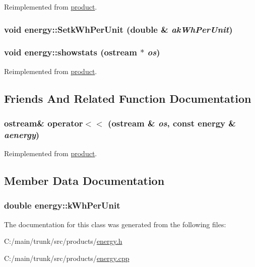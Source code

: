 Reimplemented from \hyperlink{classproduct_a1edb3e3d0619a2db8b8f1c95fed582ce}{product}.\hypertarget{classenergy_a9e9bf5c07d0b8455dcbbd45912533a12}{
\subsubsection[{SetkWhPerUnit}]{\setlength{\rightskip}{0pt plus 5cm}void energy::SetkWhPerUnit (double \& {\em akWhPerUnit})}}
\label{classenergy_a9e9bf5c07d0b8455dcbbd45912533a12}
\hypertarget{classenergy_af421b83f011aca4bc2ee21df490e9326}{
\subsubsection[{showstats}]{\setlength{\rightskip}{0pt plus 5cm}void energy::showstats (ostream $\ast$ {\em os})}}
\label{classenergy_af421b83f011aca4bc2ee21df490e9326}


Reimplemented from \hyperlink{classproduct_a1151ea416ab90047f8d087be57a6d7b1}{product}.

\subsection{Friends And Related Function Documentation}
\hypertarget{classenergy_a2dc316263ecd43c6bc3bafcffda896f9}{
\subsubsection[{operator$<$$<$}]{\setlength{\rightskip}{0pt plus 5cm}ostream\& operator$<$$<$ (ostream \& {\em os}, \/  const {\bf energy} \& {\em aenergy})}}
\label{classenergy_a2dc316263ecd43c6bc3bafcffda896f9}


Reimplemented from \hyperlink{classproduct_a1b6bf2f2c82a18a17907ee1192fd94bb}{product}.

\subsection{Member Data Documentation}
\hypertarget{classenergy_a019d21c451c9235ae6e999308c48c05d}{
\subsubsection[{kWhPerUnit}]{\setlength{\rightskip}{0pt plus 5cm}double {\bf energy::kWhPerUnit}}}
\label{classenergy_a019d21c451c9235ae6e999308c48c05d}


The documentation for this class was generated from the following files:\begin{DoxyCompactItemize}
\item 
C:/main/trunk/src/products/\hyperlink{energy_8h}{energy.h}\item 
C:/main/trunk/src/products/\hyperlink{energy_8cpp}{energy.cpp}\end{DoxyCompactItemize}
